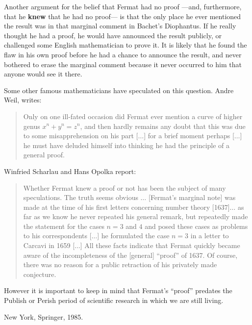  Another argument for the belief that Fermat had no proof ---and,
 furthermore, that he {\bf knew} that he had no proof--- is that the
only place he ever mentioned the result was in that marginal comment in
Bachet's Diophantus. If he really thought he had a proof, he would have
announced the result publicly, or challenged some English mathematician
to prove it. It is likely that he found the flaw in his own proof before
he had a chance to announce the result, and never bothered to erase the
marginal comment because it never occurred to him that anyone would see
it there.

Some other famous mathematicians have speculated on this question.
Andre Weil, writes:
\begin{quote}
Only on one ill-fated occasion did Fermat ever mention
a curve of higher genus $x^n+y^n=z^n$, and then hardly remains any
doubt that this was due to some misapprehension on his part [$\ldots$]
 for a brief moment perhaps [$\ldots$] he must have deluded himself
into thinking he had the principle of a general proof.
\end{quote}

Winfried Scharlau and Hans Opolka report:
\begin{quote}
Whether
Fermat knew a proof or not has been the subject of many speculations.  The
truth seems obvious $\ldots$ [Fermat's marginal note] was made at the time of his
first letters concerning number theory [1637]$\ldots$ as far as we know he never
repeated his general remark, but repeatedly made the statement for the
cases $n=3$ and $4$ and posed these cases as problems to his correspondents
[$\ldots$] he formulated the case $n=3$ in a letter to Carcavi in 1659
[$\ldots$]  All these
facts indicate that Fermat quickly became aware of the incompleteness of
the [general] ``proof'' of 1637.  Of course, there was no reason for a public
retraction of his privately made conjecture.
\end{quote}



However it is important to keep in mind that Fermat's ``proof''
 predates the Publish or
Perish period of scientific research in which we are still living.


\Ref

{New York, Springer, 1985.}

